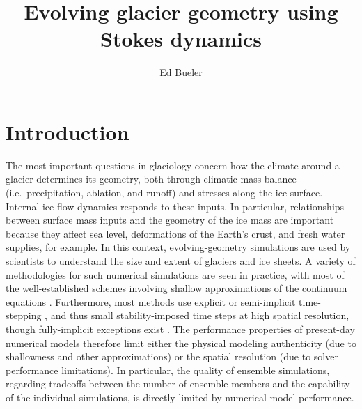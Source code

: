 \documentclass[letterpaper,final,12pt,reqno]{amsart}
\begin{document}
\title{Evolving glacier geometry using Stokes dynamics}

\author{Ed Bueler}


\maketitle

\thispagestyle{empty}
\bigskip

\section{Introduction} \label{sec:intro}

The most important questions in glaciology concern how the climate around a glacier determines its geometry, both through climatic mass balance (i.e.~precipitation, ablation, and runoff) and stresses along the ice surface.  Internal ice flow dynamics responds to these inputs.  In particular, relationships between surface mass inputs and the geometry of the ice mass are important because they affect sea level, deformations of the Earth's crust, and fresh water supplies, for example.  In this context, evolving-geometry simulations are used by scientists to understand the size and extent of glaciers and ice sheets.  A variety of methodologies for such numerical simulations are seen in practice, with most of the well-established schemes involving shallow approximations of the continuum equations \cite[for example]{Hoffmanetal2018,Lipscombetal2019,Winkelmannetal2011}.  Furthermore, most methods use explicit or semi-implicit time-stepping \cite{HindmarshPayne1996,Hoffmanetal2018,Lipscombetal2019,Winkelmannetal2011}, and thus small stability-imposed time steps at high spatial resolution, though fully-implicit exceptions exist \cite{Brinkerhoffetal2017,Bueler2016}.  The performance properties of present-day numerical models therefore limit either the physical modeling authenticity (due to shallowness and other approximations) or the spatial resolution (due to solver performance limitations).  In particular, the quality of ensemble simulations, regarding tradeoffs between the number of ensemble members and the capability of the individual simulations, is directly limited by numerical model performance.
\end{document}
